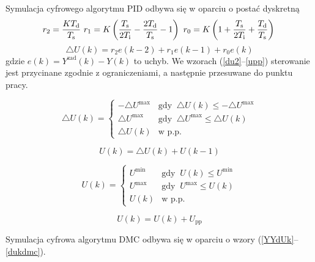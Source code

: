 Symulacja cyfrowego algorytmu PID odbywa się w oparciu o postać dyskretną
\begin{equation}
r_2 = \frac{K T_{\mathrm{d}}}{T_{\mathrm{s}}} \
r_1 = K \left( \frac{T_{\mathrm{s}}}{2 T_{\mathrm{i}}} - \frac{2 T_{\mathrm{d}}}{T_{\mathrm{s}}} - 1 \right) \
r_0 = K \left( 1 + \frac{T_{\mathrm{s}}}{2 T_{\mathrm{i}}} + \frac{T_{\mathrm{d}}}{T_{\mathrm{s}}} \right) \\
\label{r_t}
\end{equation}
\begin{equation}
\triangle U(k) = r_2 e(k-2) + r_1 e(k-1) + r_0 e(k)
\label{du}
\end{equation}
gdzie $e(k)=Y^{\mathrm{zad}}(k) - Y(k)$ to uchyb. We wzorach (\ref{du2}--\ref{upp}) sterowanie jest przycinane zgodnie z ograniczeniami, a następnie przesuwane do punktu pracy.

\begin{equation}
\triangle U(k) = 
\begin{cases}
-\triangle U^{\mathrm{max}} & \textrm{gdy } \ \triangle U(k) \le -\triangle U^{\mathrm{max}} \\
\triangle U^{\mathrm{max}} & \textrm{gdy } \ \triangle U^{\mathrm{max}} \le \triangle U(k) \\
\triangle U(k) & \textrm{w p.p.}
\end{cases}
\label{du2}
\end{equation}

\begin{equation}
U(k) = \triangle U(k) + U(k-1)
\label{uk}
\end{equation}

\begin{equation}
U(k) = 
\begin{cases}
U^{\mathrm{min}} & \textrm{gdy } \ U(k) \le U^{\mathrm{min}} \\
U^{\mathrm{max}} & \textrm{gdy } \ U^{\mathrm{max}} \le U(k) \\
U(k) & \textrm{w p.p.}
\end{cases}
\label{uk2}
\end{equation}

\begin{equation}
U(k) = U(k) + U_{\mathrm{pp}}
\label{upp}
\end{equation}

Symulacja cyfrowa algorytmu DMC odbywa się w oparciu o wzory (\ref{YYdUk}--\ref{dukdmc}).

